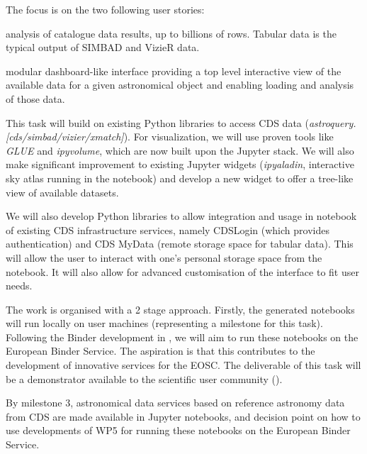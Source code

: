 \begin{task}[
  title=Astronomy application,
  id=astro,
  lead=CDS,
  PM=18,
  wphases={18-42},
  partners={QS,WTT,SRL,INSERM,XFEL}
]
  The focus is on the two following user stories:
    \begin{compactitem}
        \item analysis of catalogue data results, up to billions of rows.
              Tabular data is the typical output of SIMBAD and VizieR data.
        \item modular dashboard-like interface providing a top level
              interactive view of the available data for a given astronomical
              object and enabling loading and analysis of those data.
    \end{compactitem}

  This task will build on existing Python libraries to access CDS data
  (\textit{astroquery.[cds/simbad/vizier/xmatch]}). For visualization, we will 
  use proven tools like \textit{GLUE} and \textit{ipyvolume}, which are now 
  built upon the Jupyter stack.
  We will also make significant improvement to existing Jupyter widgets 
  (\textit{ipyaladin}, interactive sky atlas running in the notebook) and 
  develop a new widget to offer a tree-like view of available datasets.

  We will also develop Python libraries to allow integration and usage in
  notebook of existing CDS infrastructure services, namely CDSLogin (which
  provides authentication) and CDS MyData (remote storage space for tabular
  data).
  This will allow the user to interact with one's personal storage space from
  the notebook. It will also allow for advanced customisation of the interface 
  to fit user needs.

  The work is organised with a 2 stage approach. Firstly, the generated 
  notebooks will run locally on user machines (representing a milestone for 
  this task). Following the Binder development in , we will aim 
  to run these notebooks on the European Binder Service. The aspiration is 
  that this contributes to the development of innovative services for the EOSC.
  The deliverable of this task will be a demonstrator available to the 
  scientific user community ().

  By milestone 3, astronomical data services based on reference astronomy data from CDS are made available in Jupyter notebooks, and decision point on how to use developments of WP5 for running these notebooks on the European Binder Service.


\end{task}

